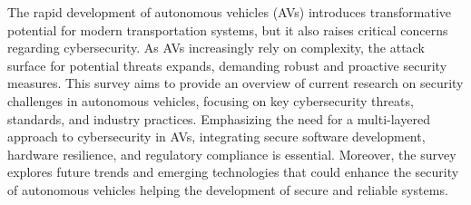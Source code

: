 The rapid development of autonomous vehicles (AVs)
introduces transformative potential for modern transportation systems,
but it also raises critical concerns regarding cybersecurity.
As AVs increasingly rely on complexity, the attack surface for potential threats expands,
demanding robust and proactive security measures.
This survey aims to provide an overview of current research on security challenges in autonomous vehicles,
focusing on key cybersecurity threats, standards, and industry practices.
Emphasizing the need for a multi-layered approach to cybersecurity in AVs,
integrating secure software development, hardware resilience, and regulatory compliance is essential.
Moreover,
the survey explores future trends and emerging technologies that could enhance the security of autonomous vehicles helping the development of secure and reliable systems.